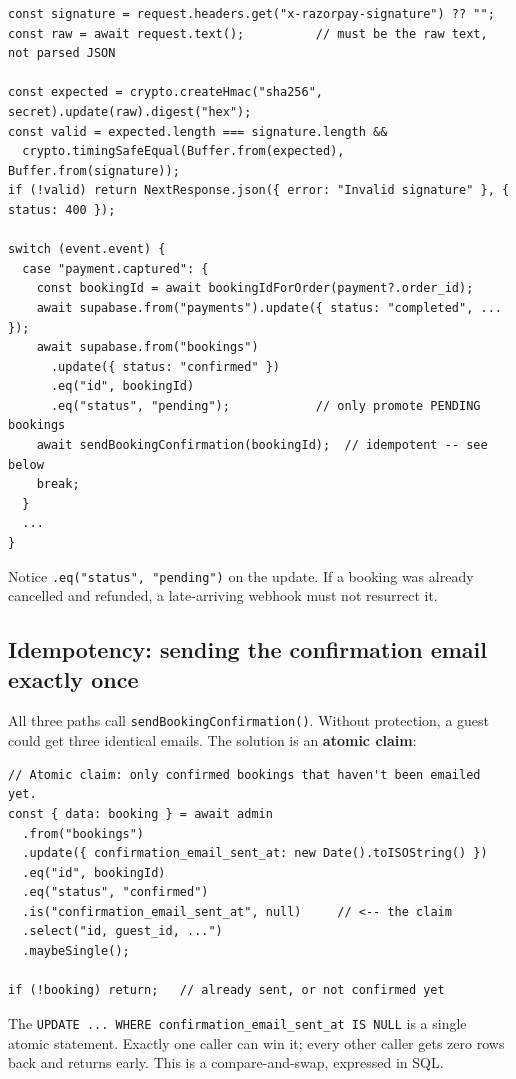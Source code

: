 \documentclass[11pt,a4paper]{article}
\begin{document}
\begin{lstlisting}[language=TS,caption={app/api/webhooks/razorpay/route.ts --- signature over the RAW body}]
const signature = request.headers.get("x-razorpay-signature") ?? "";
const raw = await request.text();          // must be the raw text, not parsed JSON

const expected = crypto.createHmac("sha256", secret).update(raw).digest("hex");
const valid = expected.length === signature.length &&
  crypto.timingSafeEqual(Buffer.from(expected), Buffer.from(signature));
if (!valid) return NextResponse.json({ error: "Invalid signature" }, { status: 400 });

switch (event.event) {
  case "payment.captured": {
    const bookingId = await bookingIdForOrder(payment?.order_id);
    await supabase.from("payments").update({ status: "completed", ... });
    await supabase.from("bookings")
      .update({ status: "confirmed" })
      .eq("id", bookingId)
      .eq("status", "pending");            // only promote PENDING bookings
    await sendBookingConfirmation(bookingId);  // idempotent -- see below
    break;
  }
  ...
}
\end{lstlisting}

Notice \texttt{.eq("status", "pending")} on the update. If a booking was already
cancelled and refunded, a late-arriving webhook must not resurrect it.

\subsection{Idempotency: sending the confirmation email exactly once}

All three paths call \texttt{sendBookingConfirmation()}. Without protection, a
guest could get three identical emails. The solution is an \textbf{atomic claim}:

\begin{lstlisting}[language=TS,caption={lib/emails/bookingConfirmation.ts}]
// Atomic claim: only confirmed bookings that haven't been emailed yet.
const { data: booking } = await admin
  .from("bookings")
  .update({ confirmation_email_sent_at: new Date().toISOString() })
  .eq("id", bookingId)
  .eq("status", "confirmed")
  .is("confirmation_email_sent_at", null)     // <-- the claim
  .select("id, guest_id, ...")
  .maybeSingle();

if (!booking) return;   // already sent, or not confirmed yet
\end{lstlisting}

The \texttt{UPDATE ... WHERE confirmation\_email\_sent\_at IS NULL} is a single
atomic statement. Exactly one caller can win it; every other caller gets zero rows
back and returns early. This is a compare-and-swap, expressed in SQL.
\end{document}
